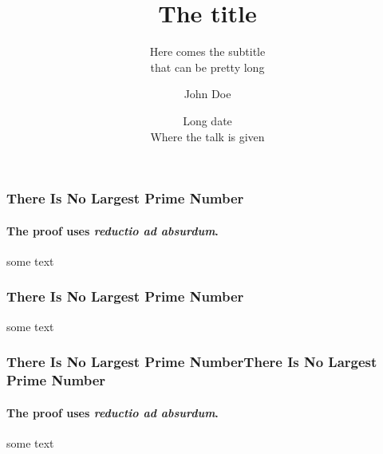 \documentclass[aspectratio=1610,t]{beamer}
\title{The title}
\subtitle{Here comes the subtitle\\that can be pretty long}
\date[Short date]{Long date\\ Where the talk is given}
\author[email]{John Doe}
\institute{Institute}
\begin{document}
\begin{frame}%
    \frametitle{There Is No Largest Prime Number} 
    \framesubtitle{The proof uses \textit{reductio ad absurdum}.} 
        some text
\end{frame}

\begin{frame}%
    \frametitle{There Is No Largest Prime Number}  
        some text
\end{frame}

\begin{frame}%
    \frametitle{There Is No Largest Prime NumberThere Is No Largest Prime Number} 
    \framesubtitle{The proof uses \textit{reductio ad absurdum}.} 
        some text
\end{frame}
\end{document}

